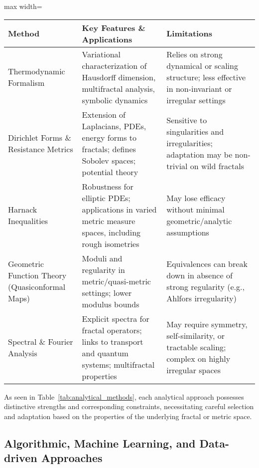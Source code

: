 \documentclass[sigconf]{acmart}
\begin{document}
\begin{table*}[htbp]
\centering
\caption{Comparative Overview of Analytical Techniques for Fractal and Metric Spaces}
\label{tab:analytical_methods}
\begin{adjustbox}{max width=\textwidth}
\begin{tabular}{lll}
\toprule
\textbf{Method} & \textbf{Key Features \& Applications} & \textbf{Limitations} \\
\midrule
Thermodynamic Formalism & Variational characterization of Hausdorff dimension, multifractal analysis, symbolic dynamics & Relies on strong dynamical or scaling structure; less effective in non-invariant or irregular settings \\
Dirichlet Forms \& Resistance Metrics & Extension of Laplacians, PDEs, energy forms to fractals; defines Sobolev spaces; potential theory & Sensitive to singularities and irregularities; adaptation may be non-trivial on wild fractals \\
Harnack Inequalities & Robustness for elliptic PDEs; applications in varied metric measure spaces, including rough isometries & May lose efficacy without minimal geometric/analytic assumptions \\
Geometric Function Theory (Quasiconformal Maps) & Moduli and regularity in metric/quasi-metric settings; lower modulus bounds & Equivalences can break down in absence of strong regularity (e.g., Ahlfors irregularity) \\
Spectral \& Fourier Analysis & Explicit spectra for fractal operators; links to transport and quantum systems; multifractal properties & May require symmetry, self-similarity, or tractable scaling; complex on highly irregular spaces \\
\bottomrule
\end{tabular}
\end{adjustbox}
\end{table*}

As seen in Table~\ref{tab:analytical_methods}, each analytical approach possesses distinctive strengths and corresponding constraints, necessitating careful selection and adaptation based on the properties of the underlying fractal or metric space.

\subsection{Algorithmic, Machine Learning, and Data-driven Approaches}
\end{document}
